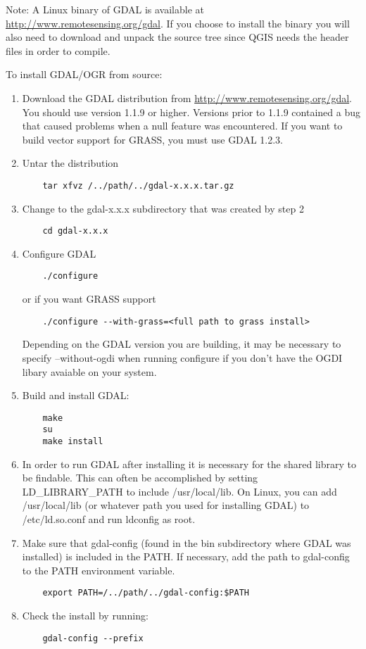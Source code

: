   Note: A Linux binary of GDAL is available at \url{http://www.remotesensing.org/gdal}. If you choose to install the binary you will also need to download and unpack the source tree since QGIS needs the header files in order to compile.
  
  To install GDAL/OGR from source:
  \begin{enumerate}
  \item Download the GDAL distribution from \url{http://www.remotesensing.org/gdal}. You should use version 1.1.9 or higher. Versions prior to 1.1.9 contained a bug that caused problems when a null feature was encountered. If you want to build vector support for GRASS, you must use GDAL 1.2.3.

  \item Untar the distribution 
  \begin{verbatim}
    tar xfvz /../path/../gdal-x.x.x.tar.gz
  \end{verbatim}

  \item Change to the gdal-x.x.x subdirectory that was created by step 2
  \begin{verbatim}
    cd gdal-x.x.x
  \end{verbatim}

  \item Configure GDAL
  \begin{verbatim}
    ./configure 
  \end{verbatim}
  or if you want GRASS support
  \begin{verbatim}
    ./configure --with-grass=<full path to grass install>
  \end{verbatim}
  Depending on the GDAL version you are building, it may be necessary to specify --without-ogdi when running configure if you don't have the OGDI libary avaiable on your system.

  \item Build and install GDAL:
  \begin{verbatim}
    make
    su
    make install
  \end{verbatim}

  \item In order to run GDAL after installing it is necessary for the shared
  library to be findable. This can often be accomplished by setting
  LD\_LIBRARY\_PATH to include /usr/local/lib. On Linux, you can add
  /usr/local/lib (or whatever path you used for installing GDAL) to
  /etc/ld.so.conf and run ldconfig as root.

  \item Make sure that gdal-config (found in the bin subdirectory where GDAL was installed) is included in the PATH. If necessary, add the path to gdal-config to the PATH environment variable.
  \begin{verbatim}
    export PATH=/../path/../gdal-config:$PATH
  \end{verbatim}

  \item Check the install by running:
  \begin{verbatim}
    gdal-config --prefix
  \end{verbatim}

  \end{enumerate}

